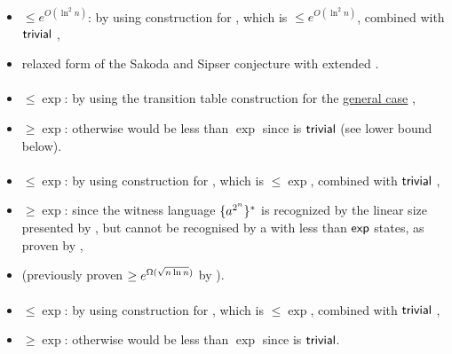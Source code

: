 \paragraph{\TNFA{}\tto\ODLA}
\begin{itemize}
	\item $\le e^{O(\ln^2n)}$: by using construction for \hyperref[cost:2NFAto2DFAu]{\TNFA{}\tto\TDFA}, which is $\le e^{O(\ln^2n)}$, combined with $\mathsf{trivial}$ \TDFA{}\tto\ODLA,
	\item relaxed form of the Sakoda and Sipser conjecture with extended \TDFA.
\end{itemize}
\paragraph{\ODLA{}\tto\ODFA}\label{cost:1DLAto1DFAu}
\begin{itemize}
	\item $\le\exp$: by using the transition table construction for the \hyperref[cost:1DLAto1DFA]{general case} \cite{PigPis14},
	\item $\ge\exp$: otherwise \hyperref[cost:1DLAto2NFAu]{\ODLA{}\tto\TNFA} would be less than $\exp$ since \ODFA{}\tto\TNFA is $\mathsf{trivial}$ (see lower bound below).
\end{itemize}
\paragraph{\ODLA{}\tto\TNFA}\label{cost:1DLAto2NFAu}
\begin{itemize}
	\item $\le\exp$: by using construction for \hyperref[cost:1DLAto1DFAu]{\ODLA{}\tto\ODFA}, which is $\le\exp$, combined with $\mathsf{trivial}$ \ODFA{}\tto\TNFA,
	\item $\ge\exp$: since the witness language $\{a^{2^n}\}^*$ is recognized by the linear size \ODLA presented by , but cannot be recognised by a \TNFA with less than $\mathsf{exp}$ states, as proven by ,
	\item (previously proven $\ge e^{\Omega(\sqrt{n\ln n})}$ by ).
\end{itemize}
\paragraph{\ODLA{}\tto\ONFA}\label{cost:1LAto1NFAu}
\begin{itemize}
	\item $\le\exp$: by using construction for \hyperref[cost:1DLAto1DFAu]{\ODLA{}\tto\ODFA}, which is $\le\exp$, combined with $\mathsf{trivial}$ \ODFA{}\tto\ONFA,
	\item $\ge\exp$: otherwise \hyperref[cost:1DLAto2NFAu]{\ODLA{}\tto\TNFA} would be less than $\exp$ since \ONFA{}\tto\TNFA is $\mathsf{trivial}$.
\end{itemize}
